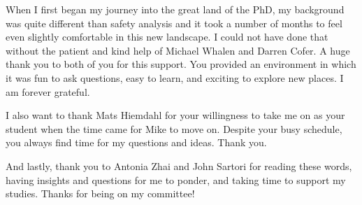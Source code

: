 When I first began my journey into the great land of the PhD, my background was quite different than safety analysis and it took a number of months to feel even slightly comfortable in this new landscape. I could not have done that without the patient and kind help of Michael Whalen and Darren Cofer. A huge thank you to both of you for this support. You provided an environment in which it was fun to ask questions, easy to learn, and exciting to explore new places. I am forever grateful. 

I also want to thank Mats Hiemdahl for your willingness to take me on as your student when the time came for Mike to move on. Despite your busy schedule, you always find time for my questions and ideas. Thank you. 

And lastly, thank you to Antonia Zhai and John Sartori for reading these words, having insights and questions for me to ponder, and taking time to support my studies. Thanks for being on my committee!